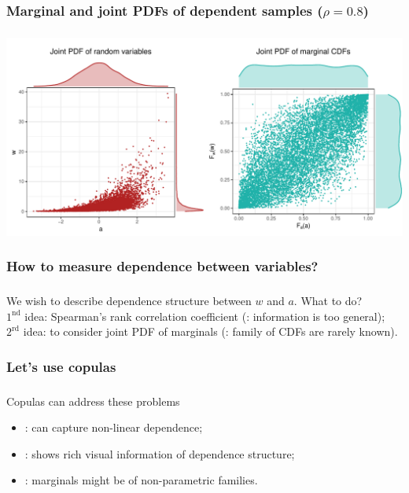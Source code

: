 \documentclass[aspectratio=169]{beamer}
\begin{document}
		\subsubsection{Marginal and joint PDFs of dependent samples ($ \rho = 0.8 $)}
			\begin{frame}
				\frametitle{\insertsubsubsection}				
				
				\begin{center}
					\includegraphics[width=0.95\linewidth]{plots/introduction/dep}
				\end{center}
				
			\end{frame}
	
		\subsubsection{How to measure dependence between variables?}
			\begin{frame}
				\frametitle{\insertsubsubsection}
				
				 We wish to describe dependence structure between $ w $ and $ a $. What to do? \\[1em]
				
				\onslide<2-> $ 1^\text{nd} $ idea: Spearman's rank correlation coefficient (: information is too general); \\[1em]
				
				\onslide<3-> $ 2^\text{rd} $ idea: to consider joint PDF of marginals (: family of CDFs are rarely known).
				
			\end{frame}
			
		\subsubsection{Let's use copulas}
			\begin{frame}
				\frametitle{\insertsubsubsection}
				
				Copulas can address these problems
				\begin{itemize}
					\item[] : can capture non-linear dependence;
					\item[] : shows rich visual information of dependence structure;
					\item[] : marginals might be of non-parametric families.
					
				\end{itemize}
				
			\end{frame}
			
\end{document}
